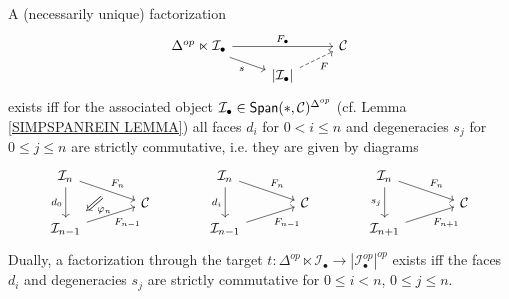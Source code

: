 \documentclass[a4paper,10pt]{article}%
\begin{document}
\begin{lemma}\label{SOURCEFACT LEM}
	A (necessarily unique) factorization
\begin{equation}\label{SOURCEFACT EQ}
	\begin{tikzcd}[row sep = 0.5em]
	\Delta^{op} \ltimes \mcI_{\bullet} \ar{rr}{F_{\bullet}} \ar{rd}[swap]{s}& & \C \\
	& \left|\mcI_{\bullet}\right| \ar[dashed]{ru}[swap]{F}
	\end{tikzcd}
\end{equation}
	exists iff for the associated object 
	$\mcI_{\bullet} \in \mathsf{Span}(\**,\C)^{\Delta^{op}}$
	(cf. Lemma \ref{SIMPSPANREIN LEMMA})
	all faces $d_i$ for $0<i\leq n$ and degeneracies $s_j$ for $0\leq j \leq n$ are strictly commutative, i.e. they are given by diagrams
\begin{equation}\label{IDENTSIMPRELS EQ}
	\begin{tikzcd}[row sep=0.4em,column sep = 3.5em]
		\mathcal{I}_n
		\ar{dr}[name=F1]{F_n} \ar{dd}[swap]{d_0} & &
		\mathcal{I}_n
		\ar{dr}{F_n} \ar{dd}[swap]{d_i} & &
		\mathcal{I}_n
		\ar{dr}{F_n} \ar{dd}[swap]{s_j} &
	\\
 & \C & & \C & & \C
	\\
|[alias=G2]| \mathcal{I}_{n-1}  \ar{ur}[swap]{F_{n-1}} & & 
 \mathcal{I}_{n-1}  \ar{ur}[swap]{F_{n-1}} & &
 \mathcal{I}_{n+1}  \ar{ur}[swap]{F_{n+1}} &
		\arrow[Rightarrow, from=F1, to=G2,shorten >=0.25cm,shorten <=0.25cm,"\varphi_n"]
	\end{tikzcd}
\end{equation}
Dually, a factorization through the target 
$t \colon \Delta^{op} \ltimes \mathcal{I}_{\bullet}
\to |\mathcal{I}_{\bullet}^{op}|^{op}$
exists iff the faces $d_i$ and degeneracies 
$s_j$ are strictly commutative for
$0\leq i <n$, $0\leq j \leq n$.
\end{lemma}
\end{document}
